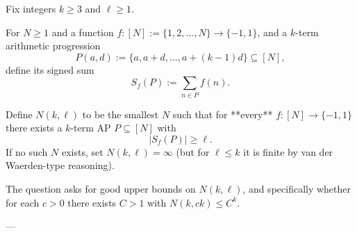 Fix integers $k\ge 3$ and $\ell\ge 1$.

For $N\ge 1$ and a function $f:[N]:=\{1,2,\dots,N\}\to\{-1,1\}$, and a $k$-term arithmetic progression
\[
P(a,d):=\{a,a+d,\dots,a+(k-1)d\}\subseteq [N],
\]
define its signed sum
\[
S_f(P):=\sum_{n\in P} f(n).
\]

Define $N(k,\ell)$ to be the smallest $N$ such that for **every** $f:[N]\to\{-1,1\}$ there exists a $k$-term AP $P\subseteq [N]$ with
\[
|S_f(P)|\ge \ell.
\]
If no such $N$ exists, set $N(k,\ell)=\infty$ (but for $\ell\le k$ it is finite by van der Waerden-type reasoning).

The question asks for good upper bounds on $N(k,\ell)$, and specifically whether for each $c>0$ there exists $C>1$ with $N(k,ck)\le C^k$.

---
